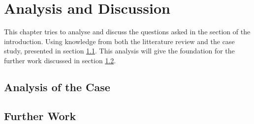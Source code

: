 \chapter{Analysis and Discussion}
This chapter tries to analyse and discuss the questions asked in the  section of the introduction. Using knowledge from both the litterature review and the case study, presented in section \ref{sec:analysis}. This analysis will give the foundation for the further work discussed in section \ref{sec:further_work}. 
\section{Analysis of the Case} \label{sec:analysis}
\section{Further Work} \label{sec:further_work}

\cleardoublepage
